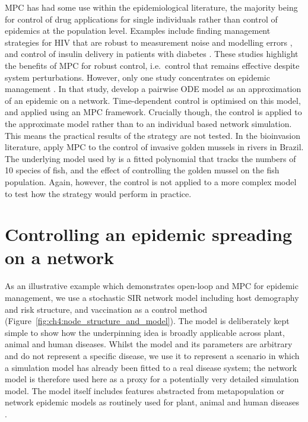 MPC has had some use within the epidemiological literature, the majority being for control of drug applications for single individuals rather than control of epidemics at the population level. Examples include finding management strategies for HIV that are robust to measurement noise and modelling errors \citep{zurakowski_model_2006, david_receding_2011}, and control of insulin delivery in patients with diabetes \citep{hovorka_nonlinear_2004}. These studies highlight the benefits of MPC for robust control, i.e.\ control that remains effective despite system perturbations. However, only one study concentrates on epidemic management \citep{selley_dynamic_2015}. In that study, \citeauthor{selley_dynamic_2015} develop a pairwise ODE model as an approximation of an epidemic on a network. Time-dependent control is optimised on this model, and applied using an MPC framework. Crucially though, the control is applied to the approximate model rather than to an individual based network simulation. This means the practical results of the strategy are not tested. In the bioinvasion literature, \citet{de_model_2019} apply MPC to the control of invasive golden mussels in rivers in Brazil. The underlying model used by \citet{de_model_2019} is a fitted polynomial that tracks the numbers of 10 species of fish, and the effect of controlling the golden mussel on the fish population. Again, however, the control is not applied to a more complex model to test how the strategy would perform in practice.

\section{Controlling an epidemic spreading on a network\label{sec:ch4:Controlling}}

As an illustrative example which demonstrates open-loop and MPC for epidemic management, we use a stochastic SIR network model including host demography and risk structure, and vaccination as a control method (Figure~\ref{fig:ch4:node_structure_and_model}). The model is deliberately kept simple to show how the underpinning idea is broadly applicable across plant, animal and human diseases. Whilst the model and its parameters are arbitrary and do not represent a specific disease, we use it to represent a scenario in which a simulation model has already been fitted to a real disease system; the network model is therefore used here as a proxy for a potentially very detailed simulation model. The model itself includes features abstracted from metapopulation or network epidemic models as routinely used for plant, animal and human diseases \citep{rowthorn_optimal_2009, keeling_dynamics_2001, keeling_metapopulation_2000, margosian_connectivity_2009, bansal_individual_2007}.

